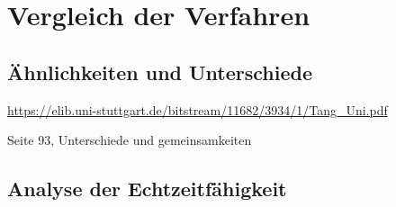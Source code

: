 \chapter{Vergleich der Verfahren}

\section{Ähnlichkeiten und Unterschiede}

\url{https://elib.uni-stuttgart.de/bitstream/11682/3934/1/Tang_Uni.pdf} 

Seite 93, Unterschiede und gemeinsamkeiten 

\section{Analyse der Echtzeitfähigkeit}



